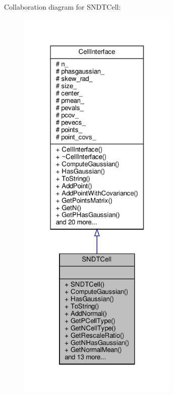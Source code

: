 Collaboration diagram for S\+N\+D\+T\+Cell\+:\nopagebreak
\begin{figure}[H]
\begin{center}
\leavevmode
\includegraphics[height=550pt]{d8/ddd/classSNDTCell__coll__graph}
\end{center}
\end{figure}
